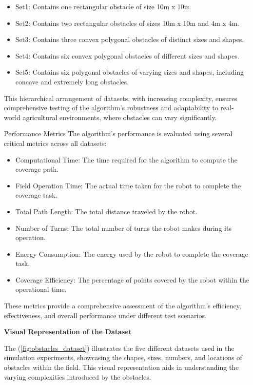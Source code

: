 \begin{itemize}
    \item Set1: Contains one rectangular obstacle of size 10m x 10m.
    \item Set2: Contains two rectangular obstacles of sizes 10m x 10m and 4m x 4m.
    \item Set3: Contains three convex polygonal obstacles of distinct sizes and shapes.
    \item Set4: Contains six convex polygonal obstacles of different sizes and shapes.
    \item Set5: Contains six polygonal obstacles of varying sizes and shapes, including concave and extremely long obstacles.
\end{itemize}
This hierarchical arrangement of datasets, with increasing complexity, ensures comprehensive testing of the algorithm's robustness and adaptability to real-world agricultural environments, where obstacles can vary significantly.

\vspace*{6mm}  

Performance Metrics
The algorithm's performance is evaluated using several critical metrics across all datasets:

\begin{itemize}
    \item Computational Time: The time required for the algorithm to compute the coverage path.
    \item Field Operation Time: The actual time taken for the robot to complete the coverage task.
    \item Total Path Length: The total distance traveled by the robot.
    \item Number of Turns: The total number of turns the robot makes during its operation.
    \item Energy Consumption: The energy used by the robot to complete the coverage task.
    \item Coverage Efficiency: The percentage of points covered by the robot within the operational time.
\end{itemize}
These metrics provide a comprehensive assessment of the algorithm's efficiency, effectiveness, and overall performance under different test scenarios.


\vspace*{6mm}  

\textbf{Visual Representation of the Dataset}

The (\autoref{fig:obstacles_dataset}) illustrates the five different datasets used in the simulation experiments, showcasing the shapes, sizes, numbers, and locations of obstacles within the field. This visual representation aids in understanding the varying complexities introduced by the obstacles.


